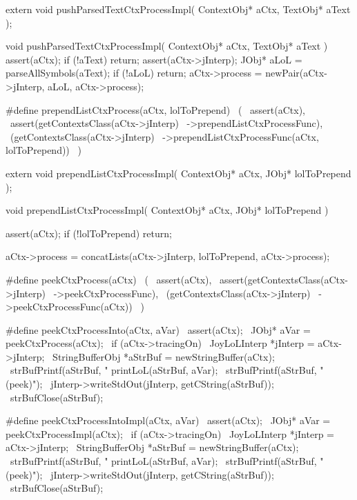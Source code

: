 \startCHeader
extern void pushParsedTextCtxProcessImpl(
  ContextObj* aCtx,
  TextObj* aText
);
\stopCHeader
{}

\startCCode
void pushParsedTextCtxProcessImpl(
  ContextObj* aCtx,
  TextObj* aText
) {
  assert(aCtx);
  if (!aText) return;
  assert(aCtx->jInterp);
  JObj* aLoL = parseAllSymbols(aText);
  if (!aLoL) return;
  aCtx->process = newPair(aCtx->jInterp, aLoL, aCtx->process);
}
\stopCCode

\startCHeader
#define prependListCtxProcess(aCtx, lolToPrepend)      \
  (                                                    \
    assert(aCtx),                                      \
    assert(getContextsClass(aCtx->jInterp)             \
      ->prependListCtxProcessFunc),                    \
    (getContextsClass(aCtx->jInterp)                   \
      ->prependListCtxProcessFunc(aCtx, lolToPrepend)) \
  )
\stopCHeader

\setCHeaderStream{private}
\startCHeader
extern void prependListCtxProcessImpl(
  ContextObj* aCtx,
  JObj* lolToPrepend
);
\stopCHeader
\setCHeaderStream{public}

\startCCode
void prependListCtxProcessImpl(
  ContextObj* aCtx,
  JObj* lolToPrepend
) {
  assert(aCtx);
  if (!lolToPrepend) return;

  aCtx->process =
    concatLists(aCtx->jInterp, lolToPrepend, aCtx->process);
}
\stopCCode

\startCHeader
#define peekCtxProcess(aCtx)                   \
  (                                            \
    assert(aCtx),                              \
    assert(getContextsClass(aCtx->jInterp)     \
      ->peekCtxProcessFunc),                   \
    (getContextsClass(aCtx->jInterp)           \
      ->peekCtxProcessFunc(aCtx))              \
  )

#define peekCtxProcessInto(aCtx, aVar)                 \
assert(aCtx);                                          \
JObj* aVar = peekCtxProcess(aCtx);                     \
if (aCtx->tracingOn) {                                 \
  JoyLoLInterp *jInterp = aCtx->jInterp;               \
  StringBufferObj *aStrBuf = newStringBuffer(aCtx);    \
  strBufPrintf(aStrBuf, "%
  printLoL(aStrBuf, aVar);                             \
  strBufPrintf(aStrBuf, " (peek)\n");                  \
  jInterp->writeStdOut(jInterp, getCString(aStrBuf));  \
  strBufClose(aStrBuf);                                \
}

#define peekCtxProcessIntoImpl(aCtx, aVar)             \
assert(aCtx);                                          \
JObj* aVar = peekCtxProcessImpl(aCtx);                 \
if (aCtx->tracingOn) {                                 \
  JoyLoLInterp *jInterp = aCtx->jInterp;               \
  StringBufferObj *aStrBuf = newStringBuffer(aCtx);    \
  strBufPrintf(aStrBuf, "%
  printLoL(aStrBuf, aVar);                             \
  strBufPrintf(aStrBuf, " (peek)\n");                  \
  jInterp->writeStdOut(jInterp, getCString(aStrBuf));  \
  strBufClose(aStrBuf);                                \
}
\stopCHeader

